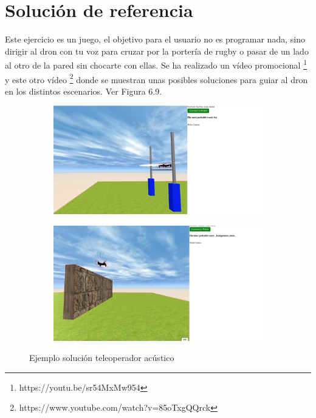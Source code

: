 \section{Solución de referencia}

Este ejercicio es un juego, el objetivo para el usuario no es programar nada, sino dirigir al dron con tu voz para cruzar por la portería de rugby o pasar de un lado al otro de la pared sin chocarte con ellas. Se ha realizado un vídeo promocional \footnote{https://youtu.be/sr54MxMw954} y este otro vídeo \footnote{https://www.youtube.com/watch?v=85oTxgQQrck} donde se muestran unas posibles soluciones para guiar al dron en los distintos escenarios. Ver Figura 6.9.

 \begin{figure}[H]
  \begin{subfigure}[b]{0.5\textwidth}
  \centering
    \includegraphics[width=1\textwidth, height=0.7\textwidth]{chapters/images/solucionaudio.png}
    \caption{}
    \label{fig:f1}
  \end{subfigure}
  \hfill
  \begin{subfigure}[b]{0.5\textwidth}
  \centering
    \includegraphics[width=1\textwidth, height=0.7\textwidth]{chapters/images/solucionaudio2.png}
	\caption{}    
    \label{fig:f2}
 
  \end{subfigure}
  \caption{Ejemplo solución teleoperador acústico}
\end{figure}


